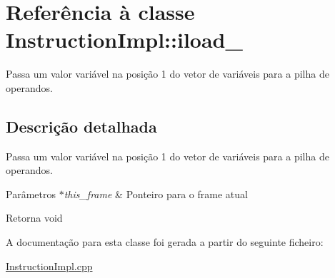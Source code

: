 \hypertarget{class_instruction_impl_1_1iload__1}{}\section{Referência à classe Instruction\+Impl\+:\+:iload\+\_}
\label{class_instruction_impl_1_1iload__1}


Passa um valor variável na posição 1 do vetor de variáveis para a pilha de operandos.  




\subsection{Descrição detalhada}
Passa um valor variável na posição 1 do vetor de variáveis para a pilha de operandos. 


\begin{DoxyParams}{Parâmetros}
{\em $\ast$this\+\_\+frame} & Ponteiro para o frame atual \\
\hline
\end{DoxyParams}
\begin{DoxyReturn}{Retorna}
void 
\end{DoxyReturn}


A documentação para esta classe foi gerada a partir do seguinte ficheiro\+:\begin{DoxyCompactItemize}
\item 
\hyperlink{_instruction_impl_8cpp}{Instruction\+Impl.\+cpp}\end{DoxyCompactItemize}
